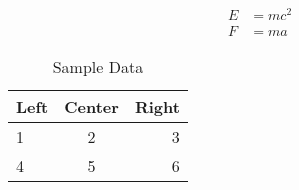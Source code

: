 

\begin{align}
  E &= mc^2 \\
  F &= ma
\end{align}

\begin{table}[htbp]
  \centering
  \caption{Sample Data}
  \begin{tabular}{|l|c|r|}
    \hline
    Left & Center & Right \\ \hline
    1 & 2 & 3 \\ \hline
    4 & 5 & 6 \\ \hline
  \end{tabular}
  \label{tab:sample}
\end{table}